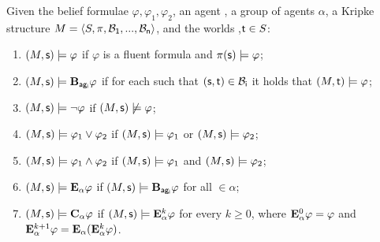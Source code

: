 \begin{definition}
Given the belief formulae
$\varphi,\varphi_{1},\varphi_{2}$, an agent , a group of agents $\alpha$, a Kripke structure $M = \langle S, \pi, \mathcal{B}_{\mathsf{1}}, ..., \mathcal{B}_{\mathsf{n}} \rangle$, and the worlds ,$\mathsf{t} \in S$:
\begin{enumerate}[label= \emph{(}\roman*\emph{)}]
\item $(M_{\mathsf{}},\mathsf{s}) \models \varphi$ if $\varphi$ is a fluent formula and $\pi(\mathsf{s})
\models \varphi$;
\item $\state{}{s} \models \bB{ag_i}{\varphi}$ if for each  such that
$\mathsf{(s,t)} \in \mathcal{B}_{\mathsf{i}}$ it holds that $ (M_{\mathsf{}},\mathsf{t}) \models \varphi$;
\item $(M_{\mathsf{}},\mathsf{s}) \models \neg \varphi$ if $(M_{\mathsf{}},\mathsf{s}) \not\models \varphi$;
\item $(M_{\mathsf{}},\mathsf{s}) \models \varphi_1 \vee \varphi_2$ if $(M_{\mathsf{}},\mathsf{s})\models
\varphi_1$ or $(M_{\mathsf{}},\mathsf{s})\models \varphi_2$;
\item $(M_{\mathsf{}},\mathsf{s}) \models \varphi_1 \wedge \varphi_2$ if $(M_{\mathsf{}},\mathsf{s})\models
\varphi_1$ and $(M_{\mathsf{}},\mathsf{s})\models \varphi_2$;
\item $(M_{\mathsf{}},\mathsf{s}) \models \mathbf{E}_\alpha{\varphi}$ if $\state{}{s} \models
\bB{ag_i}{\varphi}$ for all  $\in \alpha$;
\item $(M_{\mathsf{}},\mathsf{s}) \models \mathbf{C}_\alpha{\varphi}$ if
$(M_{\mathsf{}},\mathsf{s}) \models \mathbf{E}^{k}_\alpha{\varphi}$ for every
  $k\geq0$, where $\mathbf{E}^{0}_\alpha{\varphi} = \varphi$ and
$\mathbf{E}^{k+1}_\alpha{\varphi} =\mathbf{E}_\alpha{(\ensuremath{\mathbf{E}^{k}_\alpha{\varphi}})}$.
\end{enumerate}
\end{definition}

%
%
%
%

